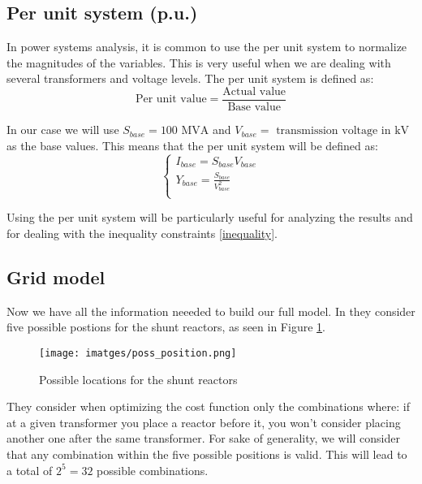 \documentclass[a4paper,11pt, titlepage, twoside]{article}
\begin{document}
\subsection{Per unit system (p.u.)}

In power systems analysis, it is common to use the per unit system to normalize the magnitudes of the variables. This is very useful when we are dealing with several transformers and voltage levels. 
The per unit system is defined as:
\begin{equation}
    \text{Per unit value} = \frac{\text{Actual value}}{\text{Base value}}
\end{equation}

In our case we will use $S_{base} =100 \text{ MVA}$ and $V_{base} = \text{ transmission voltage in kV}$ as the base values. This means that the per unit system will be defined as:
\begin{equation}
    \begin{cases}
        I_{base} = S_{base}V_{base} \\
        Y_{base} = \frac{S_{base}}{V_{base}^2} \\
    \end{cases}
\end{equation}

Using the per unit system will be particularly useful for analyzing the results and for dealing with the inequality constraints \ref{inequality}.

\subsection{Grid model}

Now we have all the information neeeded to build our full model. In \cite{paperbase} they consider five possible postions for the shunt reactors, as seen in Figure \ref{fig:poss_position}. 
\begin{figure}[H]
    \centering
	\texttt{[image: imatges/poss\_position.png]}
	\caption{Possible locations for the shunt reactors \cite{paperbase}}
    \label{fig:poss_position}
\end{figure}



They consider when optimizing the cost function only the combinations where: if at a given transformer you place a reactor before it, you won't consider placing another one
after the same transformer. For sake of generality, we will consider that any combination within the five possible positions is valid. This will lead to a total of $2^5 = 32$ possible combinations.
\end{document}
